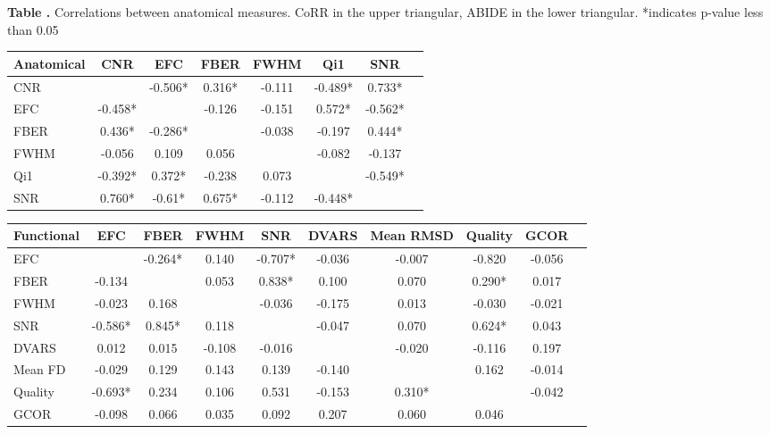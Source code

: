 \begin{table}[ht!]
\textbf{\label{tab_anat_cor} Table .}{ Correlations between anatomical measures. CoRR in the upper triangular, ABIDE in the lower triangular. *indicates p-value less than 0.05 }
\processtable{}
{\begin{tabular}{ l c c c c c c p{1.5cm}}\\
        \hline
         Anatomical & CNR & EFC & FBER & FWHM & Qi1 & SNR \\
        \hline
        CNR &  & -0.506* & 0.316* & -0.111 & -0.489* & 0.733* \\
        EFC & -0.458* &  & -0.126 & -0.151 & 0.572* & -0.562* \\
        FBER & 0.436* & -0.286* & & -0.038 & -0.197 & 0.444* \\
        FWHM & -0.056 & 0.109 & 0.056 & & -0.082 & -0.137 \\
        Qi1 & -0.392* & 0.372* & -0.238 & 0.073 & & -0.549* \\
        SNR & 0.760* & -0.61* & 0.675* & -0.112 & -0.448* & \\
        \hline
        \end{tabular}}{}
\end{table}

\begin{table}[h]
  \begin{center}
    \begin{tabular}{ l c c c c c c c c p{1.5cm}}
    \hline
    Functional & EFC & FBER & FWHM & SNR & DVARS & Mean RMSD & Quality & GCOR  \\ \hline
    EFC & & -0.264* & 0.140 & -0.707* & -0.036 & -0.007 & -0.820 & -0.056 \\
    FBER & -0.134 & & 0.053 & 0.838* & 0.100 & 0.070 & 0.290* & 0.017 \\
    FWHM & -0.023 & 0.168 & & -0.036 & -0.175 & 0.013 & -0.030 & -0.021 \\
    SNR & -0.586* & 0.845* & 0.118 & & -0.047 & 0.070 & 0.624* & 0.043 \\
    DVARS & 0.012 & 0.015 & -0.108 & -0.016 & & -0.020 & -0.116 & 0.197 \\
    Mean FD & -0.029 & 0.129 & 0.143 & 0.139 & -0.140 & & 0.162 & -0.014 \\
    Quality & -0.693* & 0.234 & 0.106 & 0.531 & -0.153 & 0.310* & & -0.042 \\
    GCOR & -0.098 & 0.066 & 0.035 & 0.092 & 0.207 & 0.060 & 0.046 & \\ 
    \hline
    \end{tabular}
  \end{center}
\end{table}

